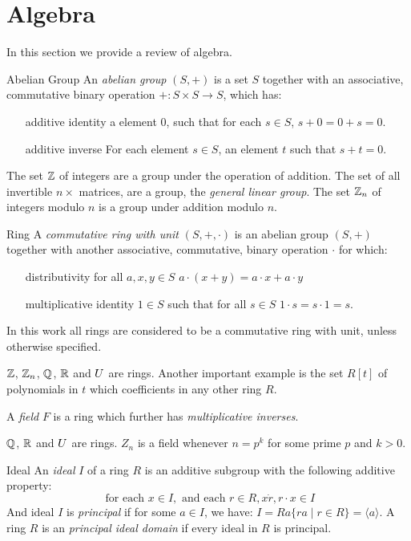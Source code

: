 \section{Algebra}
In this section we provide a review of algebra. 
\begin{definition}{Abelian Group}
An \emph{abelian group} $(S,+)$ is a set $S$ together with an associative, commutative binary operation $+: S \times S \rightarrow S$, which has:
\begin{itemize}
\item[additive identity] a element $0$, such that for each $s \in S$, $s+0 = 0+s = 0$.
\item[additive inverse] For each element $s \in S$, an element $t$ such that $s+t = 0$.
\end{itemize}
\end{definition}
\begin{example}
The set $\mathbb{Z}$ of integers are a group under the operation of addition. The set of all invertible $n \times $ matrices, are a group, the \emph{general linear group}.
The set $\mathbb{Z}_n$ of integers modulo $n$ is a group under addition modulo $n$.
\end{example}
\begin{definition}{Ring}
A \emph{commutative ring with unit} $(S,+,\cdot)$ is an abelian group $(S,+)$  together with another associative, commutative, binary operation $\cdot$ for which:
\begin{itemize}
\item[distributivity] for all $a,x,y \in S$ $a \cdot (x + y)  = a \cdot x + a \cdot y$ 
\item[multiplicative identity] $1 \in S$ such that for all $s \in S$ $1 \cdot s = s \cdot 1 = s$. 
\end{itemize}
\end{definition}
In this work all rings are considered to be a commutative ring with unit, unless otherwise specified.  
\begin{example}
$\mathbb{Z}$, $\mathbb{Z}_n$, $\mathbb{Q}$, $\mathbb{R}$ and $U$ are rings. Another important example is the set $R[t]$ of polynomials in $t$ which coefficients in any other ring $R$.
\end{example}
A \emph{field} $F$ is a ring which further has \emph{multiplicative inverses}.
\begin{example}
$\mathbb{Q}$, $\mathbb{R}$ and $U$ are rings.  $Z_n$ is a field whenever $n = p^k$ for some prime $p$ and $k > 0$.
\end{example}
\begin{definition}{Ideal}
An \emph{ideal} $I$ of a ring $R$ is an additive subgroup with the following additive property:
\[ \textrm{ for each } x \in I, \textrm{ and each } r \in R, x \dot r, r \cdot x \in I  \]
And ideal $I$ is \emph{principal} if for some $a \in I$, we have: $I = Ra \{ ra \mid r \in R\} = \langle a \rangle$.
A ring $R$ is an \emph{principal ideal domain} if every ideal in $R$ is principal.
\end{definition}
